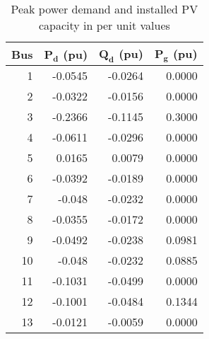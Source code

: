 
\begin{table}[!htb]\centering
    \caption{Peak power demand and installed PV capacity in per unit values}
    \begin{tabular}{rrrr}
        \hline
         \textbf{Bus} & $\mathbf{P_d}$  \textbf{(pu)} & $\mathbf{Q_d}$ \textbf{(pu)} & $\mathbf{P_g}$ \textbf{(pu)} \\
         \hline
    1     & -0.0545 & -0.0264 & 0.0000 \\
    2     & -0.0322 & -0.0156 & 0.0000 \\
    3     & -0.2366 & -0.1145 & 0.3000 \\
    4     & -0.0611 & -0.0296 & 0.0000 \\
    5     & 0.0165 & 0.0079 & 0.0000 \\
    6     & -0.0392 & -0.0189 & 0.0000 \\
    7     & -0.048 & -0.0232 & 0.0000 \\
    8     & -0.0355 & -0.0172 & 0.0000\\
    9     & -0.0492 & -0.0238 & 0.0981\\
    10     & -0.048 & -0.0232 & 0.0885 \\
    11    & -0.1031 & -0.0499 & 0.0000 \\
    12    & -0.1001 & -0.0484 & 0.1344\\
    13    & -0.0121 & -0.0059 & 0.0000 \\
        \hline
    \end{tabular}
    \label{tab:Sdata_p}
\end{table}





